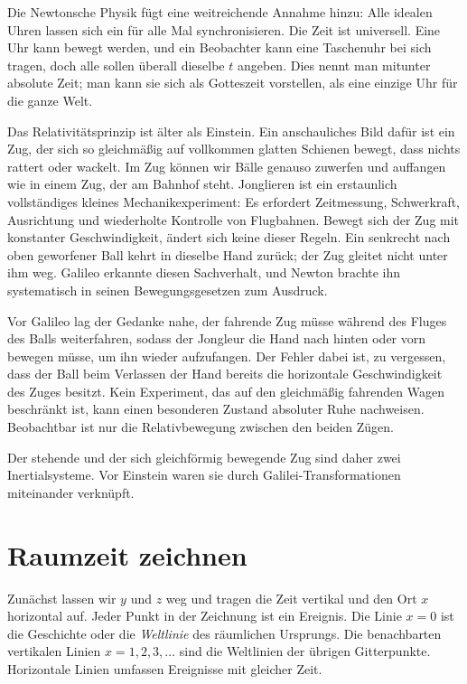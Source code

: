 Die Newtonsche Physik fügt eine weitreichende Annahme hinzu: Alle idealen Uhren lassen sich ein für alle Mal synchronisieren. Die Zeit ist universell. Eine Uhr kann bewegt werden, und ein Beobachter kann eine Taschenuhr bei sich tragen, doch alle sollen überall dieselbe \(t\) angeben. Dies nennt man mitunter absolute Zeit; man kann sie sich als Gotteszeit vorstellen, als eine einzige Uhr für die ganze Welt.

Das Relativitätsprinzip ist älter als Einstein. Ein anschauliches Bild dafür ist ein Zug, der sich so gleichmäßig auf vollkommen glatten Schienen bewegt, dass nichts rattert oder wackelt. Im Zug können wir Bälle genauso zuwerfen und auffangen wie in einem Zug, der am Bahnhof steht. Jonglieren ist ein erstaunlich vollständiges kleines Mechanikexperiment: Es erfordert Zeitmessung, Schwerkraft, Ausrichtung und wiederholte Kontrolle von Flugbahnen. Bewegt sich der Zug mit konstanter Geschwindigkeit, ändert sich keine dieser Regeln. Ein senkrecht nach oben geworfener Ball kehrt in dieselbe Hand zurück; der Zug gleitet nicht unter ihm weg. Galileo erkannte diesen Sachverhalt, und Newton brachte ihn systematisch in seinen Bewegungsgesetzen zum Ausdruck.

Vor Galileo lag der Gedanke nahe, der fahrende Zug müsse während des Fluges des Balls weiterfahren, sodass der Jongleur die Hand nach hinten oder vorn bewegen müsse, um ihn wieder aufzufangen. Der Fehler dabei ist, zu vergessen, dass der Ball beim Verlassen der Hand bereits die horizontale Geschwindigkeit des Zuges besitzt. Kein Experiment, das auf den gleichmäßig fahrenden Wagen beschränkt ist, kann einen besonderen Zustand absoluter Ruhe nachweisen. Beobachtbar ist nur die Relativbewegung zwischen den beiden Zügen.

Der stehende und der sich gleichförmig bewegende Zug sind daher zwei Inertialsysteme. Vor Einstein waren sie durch Galilei-Transformationen miteinander verknüpft.

\section{Raumzeit zeichnen}

Zunächst lassen wir \(y\) und \(z\) weg und tragen die Zeit vertikal und den Ort \(x\) horizontal auf. Jeder Punkt in der Zeichnung ist ein Ereignis. Die Linie \(x=0\) ist die Geschichte oder die \emph{Weltlinie} des räumlichen Ursprungs. Die benachbarten vertikalen Linien \(x=1,2,3,\ldots\) sind die Weltlinien der übrigen Gitterpunkte. Horizontale Linien umfassen Ereignisse mit gleicher Zeit.

